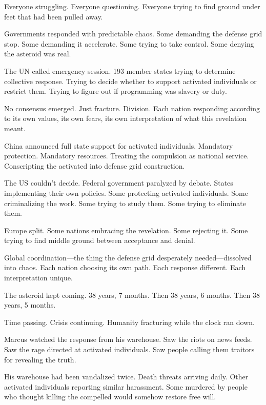Everyone struggling. Everyone questioning. Everyone trying to find ground under feet that had been pulled away.

\scenebreak

Governments responded with predictable chaos. Some demanding the defense grid stop. Some demanding it accelerate. Some trying to take control. Some denying the asteroid was real.

The UN called emergency session. 193 member states trying to determine collective response. Trying to decide whether to support activated individuals or restrict them. Trying to figure out if programming was slavery or duty.

No consensus emerged. Just fracture. Division. Each nation responding according to its own values, its own fears, its own interpretation of what this revelation meant.

China announced full state support for activated individuals. Mandatory protection. Mandatory resources. Treating the compulsion as national service. Conscripting the activated into defense grid construction.

The US couldn't decide. Federal government paralyzed by debate. States implementing their own policies. Some protecting activated individuals. Some criminalizing the work. Some trying to study them. Some trying to eliminate them.

Europe split. Some nations embracing the revelation. Some rejecting it. Some trying to find middle ground between acceptance and denial.

Global coordination—the thing the defense grid desperately needed—dissolved into chaos. Each nation choosing its own path. Each response different. Each interpretation unique.

The asteroid kept coming. 38 years, 7 months. Then 38 years, 6 months. Then 38 years, 5 months.

Time passing. Crisis continuing. Humanity fracturing while the clock ran down.

\scenebreak

Marcus watched the response from his warehouse. Saw the riots on news feeds. Saw the rage directed at activated individuals. Saw people calling them traitors for revealing the truth.

His warehouse had been vandalized twice. Death threats arriving daily. Other activated individuals reporting similar harassment. Some murdered by people who thought killing the compelled would somehow restore free will.


